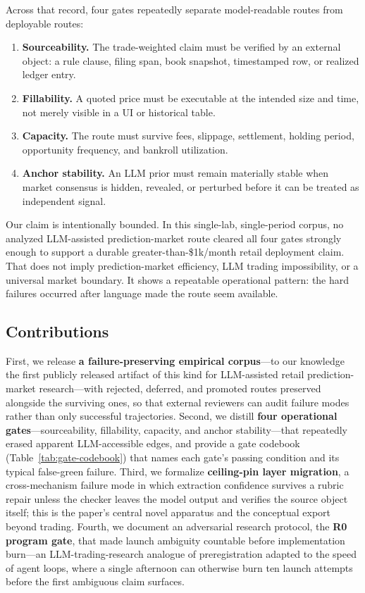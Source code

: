 \documentclass[11pt]{article}
\begin{document}
Across that record, four gates repeatedly separate model-readable routes from deployable routes:
\begin{enumerate}
\item \textbf{Sourceability.} The trade-weighted claim must be verified by an external object: a rule clause, filing span, book snapshot, timestamped row, or realized ledger entry.
\item \textbf{Fillability.} A quoted price must be executable at the intended size and time, not merely visible in a UI or historical table.
\item \textbf{Capacity.} The route must survive fees, slippage, settlement, holding period, opportunity frequency, and bankroll utilization.
\item \textbf{Anchor stability.} An LLM prior must remain materially stable when market consensus is hidden, revealed, or perturbed before it can be treated as independent signal.
\end{enumerate}

Our claim is intentionally bounded. In this single-lab, single-period corpus, no analyzed LLM-assisted prediction-market route cleared all four gates strongly enough to support a durable greater-than-\$1k/month retail deployment claim. That does not imply prediction-market efficiency, LLM trading impossibility, or a universal market boundary. It shows a repeatable operational pattern: the hard failures occurred after language made the route seem available.

\subsection{Contributions}

First, we release \textbf{a failure-preserving empirical corpus}---to our knowledge the first publicly released artifact of this kind for LLM-assisted retail prediction-market research---with rejected, deferred, and promoted routes preserved alongside the surviving ones, so that external reviewers can audit failure modes rather than only successful trajectories. Second, we distill \textbf{four operational gates}---sourceability, fillability, capacity, and anchor stability---that repeatedly erased apparent LLM-accessible edges, and provide a gate codebook (Table~\ref{tab:gate-codebook}) that names each gate's passing condition and its typical false-green failure. Third, we formalize \textbf{ceiling-pin layer migration}, a cross-mechanism failure mode in which extraction confidence survives a rubric repair unless the checker leaves the model output and verifies the source object itself; this is the paper's central novel apparatus and the conceptual export beyond trading. Fourth, we document an adversarial research protocol, the \textbf{R0 program gate}, that made launch ambiguity countable before implementation burn---an LLM-trading-research analogue of preregistration \citep{Nosek2018Preregistration} adapted to the speed of agent loops, where a single afternoon can otherwise burn ten launch attempts before the first ambiguous claim surfaces.
\end{document}
